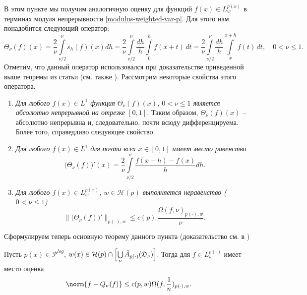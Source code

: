 В этом пункте мы получим аналогичную оценку для функций $f(x) \in L^{p(x)}_w$ в терминах модуля непрерывности \eqref{modulus-weighted-var-p}. Для этого нам понадобится следующий оператор:
\begin{equation*}
  \Theta_\nu(f)(x)=
  \frac{2}{\nu}\int\limits_{\nu/2}^{\nu} s_h(f)(x) dh =
  \frac{2}{\nu}\int\limits_{\nu/2}^{\nu} \frac{dh}{h}\int\limits_0^h f(x+t) \,dt =
  \frac{2}{\nu}\int\limits_{\nu/2}^{\nu} \frac{dh}{h}\int\limits_x^{x+h} f(t) \,dt, \quad
  0<\nu \le 1.
\end{equation*}
Отметим, что данный оператор использовался при доказательстве приведенной выше теоремы из статьи \cite[\S5]{shii-haarspeed} (см. также \cite[с. 291]{guven-trigapp}). Рассмотрим некоторые свойства этого оператора.
\begin{enumerate}[1)]
\item\label{thetaPropAbsCont}
\textit{
Для любого $f(x)\in L^1$ функция $\Theta_\nu(f)(x)$, $0<\nu \le 1$ является абсолютно непрерывной на отрезке $[0,1]$.
}
Таким образом, $\Theta_\nu(f)(x)$ -- абсолютно непрерывна и, следовательно, почти всюду дифференцируема. Более того, справедливо следующее свойство.
\item
\textit{
Для любого $f(x)\in L^1$ для почти всех $x \in [0,1]$ имеет место равенство
\begin{equation}\label{thetaDeriv}
  \bigl(\Theta_\nu(f)\bigr)'(x)=
  \frac{2}{\nu}\int\limits_{\nu/2}^{\nu}
  \frac{f(x+h)-f(x)}{h}dh.
\end{equation}
}

\item\label{thetaPropDerivEst}
\textit{
Для любого $f(x)\in L^{p(x)}_w$, $w\in \mathcal{H}(p)$ выполняется неравенство ($0 < \nu \le 1$)
\begin{equation*}
  \|\bigl(\Theta_\nu(f)\bigr)'\|_{p(\cdot),w} \le
  c(p)\,\frac{\Omega(f,\nu)_{p(\cdot),w}}{\nu}.
\end{equation*}
}
\end{enumerate}

Сформулируем теперь основную теорему данного пункта (доказательство см. в \cite{mmg-haarspeed})
\begin{theorem}
Пусть $p(x) \in \mathcal{P}^{log}$, $w(x) \in \mathcal{H}(p) \cap \Bigl[\bigcup\limits_\nu \hat{A}_{p(\cdot)}(\mathfrak{D}_\nu)\Bigr]$. Тогда для $f \in L^{p(\cdot)}_w$ \linebreak имеет место оценка
\begin{equation*}
  \norm{f-Q_n(f)} \le c(p,w)\Omega(f,\frac{1}{n})_{p(\cdot),w}.
\end{equation*}
\end{theorem}
